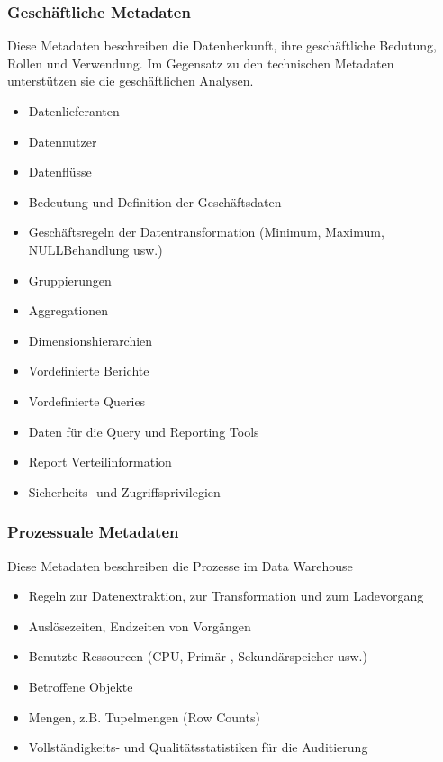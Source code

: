 \documentclass[a4paper, 11pt, nofootinbib]{article}
\begin{document}
\subsubsection{Geschäftliche Metadaten}
Diese Metadaten beschreiben die Datenherkunft, ihre geschäftliche Bedutung, Rollen und Verwendung. Im Gegensatz zu den technischen Metadaten unterstützen sie die geschäftlichen Analysen.

\begin{multicols}{2}
	\begin{itemize}
		\item Datenlieferanten 
		\item Datennutzer 
		\item Datenflüsse 
		\item Bedeutung und Definition der Geschäftsdaten 
		\item Geschäftsregeln der Datentransformation (Minimum, Maximum, NULLBehandlung usw.) 
		\item Gruppierungen 
		\item Aggregationen 
		\item Dimensionshierarchien 
		\item Vordefinierte Berichte 
		\item Vordefinierte Queries 
		\item Daten für die Query und Reporting Tools 
		\item Report Verteilinformation 
		\item Sicherheits- und Zugriffsprivilegien
	\end{itemize}
\end{multicols}

\subsubsection{Prozessuale Metadaten}
Diese Metadaten beschreiben die Prozesse im Data Warehouse

\begin{multicols}{2}
	\begin{itemize}
		\item Regeln zur Datenextraktion, zur Transformation und zum Ladevorgang
		\item Auslösezeiten, Endzeiten von Vorgängen 
		\item Benutzte Ressourcen (CPU, Primär-, Sekundärspeicher usw.) 
		\item Betroffene Objekte 
		\item Mengen, z.B. Tupelmengen (Row Counts) 
		\item Vollständigkeits- und Qualitätsstatistiken für die Auditierung 
	\end{itemize}
\end{multicols}
\end{document}
